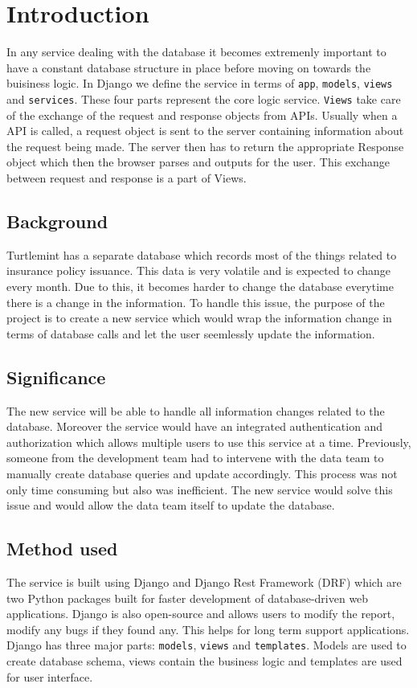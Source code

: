 \chapter{Introduction}

In any service dealing with the database it becomes extremenly important to
have a constant database structure in place before moving on towards the
buisiness logic. In Django we define the service in terms of \texttt{app},
\texttt{models}, \texttt{views} and \texttt{services}. These four parts
represent the core logic service.
\texttt{Views} take care of the exchange of the request and response objects from APIs.
Usually when a API is called, a request object is sent to the server containing
information about the request being made. The server then has to return the
appropriate Response object which then the browser parses and outputs for the
user. This exchange between request and response is a part of Views.

\section{Background}
Turtlemint has a separate database which records most of the things related to
insurance policy issuance. This data is very volatile and is expected to change
every month. Due to this, it becomes harder to change the database everytime
there is a change in the information. To handle this issue, the purpose of the
project is to create a new service which would wrap the information change in
terms of database calls and let the user seemlessly update the information.

\section{Significance}
The new service will be able to handle all information changes related to the
database. Moreover the service would have an integrated authentication and
authorization which allows multiple users to use this service at a time.
Previously, someone from the development team had to intervene with the data
team to manually create database queries and update accordingly. This process
was not only time consuming but also was inefficient. The new service would
solve this issue and would allow the data team itself to update the database.

\section{Method used}
The service is built using Django and Django Rest Framework (DRF) which are
two Python packages built for faster development of database-driven web
applications. Django is also open-source and allows users to modify the
report, modify any bugs if they found any. This helps for long term
support applications. Django has three major parts: \texttt{models},
\texttt{views} and \texttt{templates}. Models are used to create database
schema, views contain the business logic and templates are used for user
interface.

